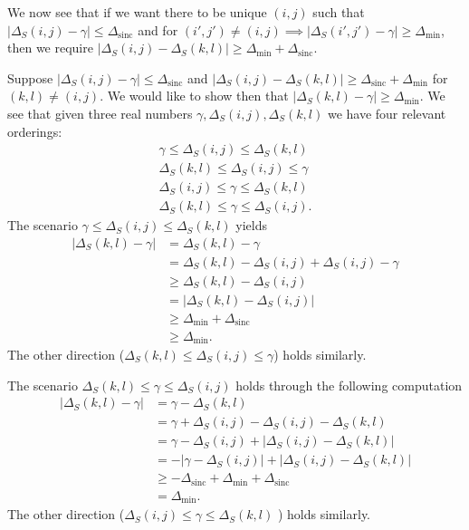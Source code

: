 \documentclass{article}
\DeclareMathOperator{\sinc}{sinc}
\begin{document}
We now see that if we want there to be unique $(i,j)$ such that $|\Delta_S(i,j) - \gamma| \leq \Delta_{\sinc}$ and for $(i',j') \neq (i,j) \implies |\Delta_S(i',j') - \gamma| \geq \Delta_{\min}$, then we require $|\Delta_S(i,j) - \Delta_S(k,l)| \geq \Delta_{\min} + \Delta_{\sinc}$. 

Suppose $|\Delta_S(i,j) - \gamma| \leq \Delta_{\sinc}$ and $|\Delta_S(i,j) - \Delta_S(k,l)| \geq \Delta_{\sinc} + \Delta_{\min}$ for $(k,l) \neq (i,j)$. We would like to show then that $|\Delta_S(k,l) - \gamma| \geq \Delta_{\min}$. We see that given three real numbers $\gamma, \Delta_S(i,j), \Delta_S(k,l)$ we have four relevant orderings:
\begin{align}
    \gamma \leq \Delta_S(i,j) \leq \Delta_S(k,l) \\
    \Delta_S(k,l) \leq \Delta_S(i,j) \leq \gamma \\
    \Delta_S(i,j) \leq \gamma \leq \Delta_S(k,l) \\
    \Delta_S(k,l) \leq \gamma \leq \Delta_S(i,j).
\end{align}
The scenario $\gamma \leq \Delta_S(i,j) \leq \Delta_S(k,l)$ yields
\begin{align}
    |\Delta_S(k,l) - \gamma| &= \Delta_S(k,l) - \gamma \\
    &= \Delta_S(k,l) - \Delta_S(i,j) + \Delta_S(i,j) - \gamma \\
    &\geq \Delta_S(k,l) - \Delta_S(i,j) \\
    &= |\Delta_S(k,l) - \Delta_S(i,j)| \\
    &\geq \Delta_{\min} + \Delta_{\sinc} \\
    &\geq \Delta_{\min}.
\end{align}
The other direction ($\Delta_S(k,l) \leq \Delta_S(i,j) \leq \gamma$) holds similarly. 

The scenario $\Delta_S(k,l) \leq \gamma \leq \Delta_S(i,j)$ holds through the following computation
\begin{align}
    |\Delta_S(k,l) - \gamma| &= \gamma - \Delta_S(k,l) \\
    &= \gamma + \Delta_S(i,j) - \Delta_S(i,j) - \Delta_S(k,l) \\
    &= \gamma - \Delta_S(i,j) + |\Delta_S(i,j) - \Delta_S(k,l)| \\
    &= -|\gamma - \Delta_S(i,j)| + |\Delta_S(i,j) - \Delta_S(k,l)| \\
    &\geq -\Delta_{\sinc} + \Delta_{\min} + \Delta_{\sinc} \\
    &= \Delta_{\min}.
\end{align}
The other direction ($\Delta_S(i,j) \leq \gamma \leq \Delta_S(k,l)$ ) holds similarly.
\end{document}
